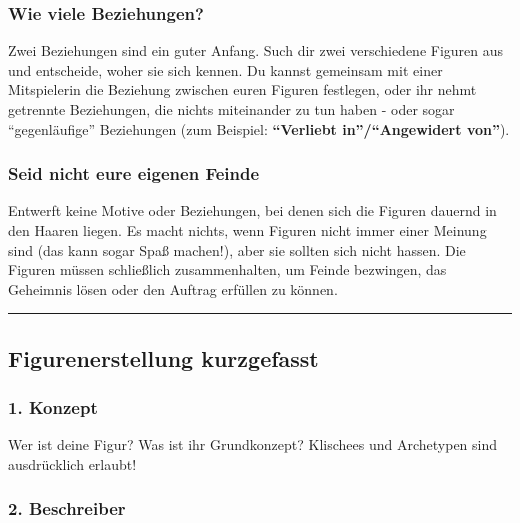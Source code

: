 \documentclass[]{article}
\begin{document}
\subsubsection{Wie viele Beziehungen?}\label{wie-viele-beziehungen}

Zwei Beziehungen sind ein guter Anfang. Such dir zwei verschiedene
Figuren aus und entscheide, woher sie sich kennen. Du kannst gemeinsam
mit einer Mitspielerin die Beziehung zwischen euren Figuren festlegen,
oder ihr nehmt getrennte Beziehungen, die nichts miteinander zu tun
haben - oder sogar ``gegenläufige'' Beziehungen (zum Beispiel:
\textbf{``Verliebt in''/``Angewidert von''}).

\subsubsection{Seid nicht eure eigenen
Feinde}\label{seid-nicht-eure-eigenen-feinde}

Entwerft keine Motive oder Beziehungen, bei denen sich die Figuren
dauernd in den Haaren liegen. Es macht nichts, wenn Figuren nicht immer
einer Meinung sind (das kann sogar Spaß machen!), aber sie sollten sich
nicht hassen. Die Figuren müssen schließlich zusammenhalten, um Feinde
bezwingen, das Geheimnis lösen oder den Auftrag erfüllen zu können.

\columnsend

\begin{center}\rule{0.5\linewidth}{\linethickness}\end{center}

\newpage

\subsection{Figurenerstellung
kurzgefasst}\label{figurenerstellung-kurzgefasst}

\subsubsection*{1. Konzept}\label{konzept-1}

Wer ist deine Figur? Was ist ihr Grundkonzept? Klischees und Archetypen
sind ausdrücklich erlaubt!

\subsubsection*{2. Beschreiber}\label{beschreiber-1}
\end{document}
